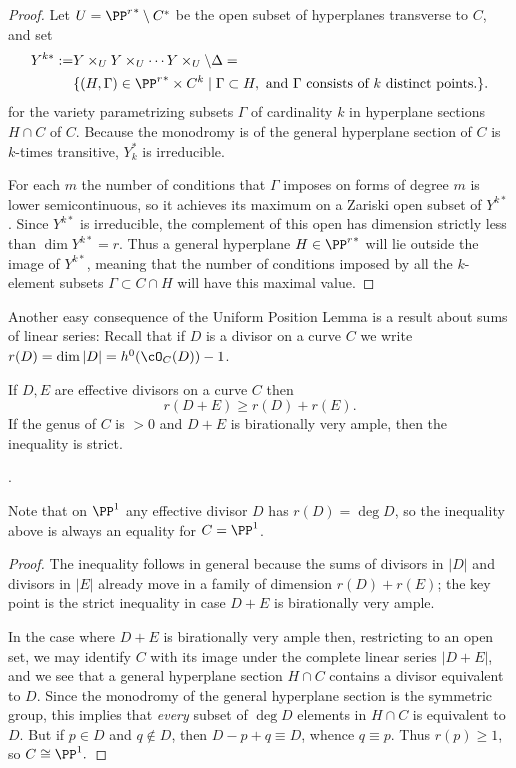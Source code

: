 \begin{proof} Let $U = {\PP^r}^* \setminus C^*$ be the open subset of hyperplanes transverse to $C$, and set
\begin{align*}
 Y^{k*} :=&Y\times_U Y\times_U \cdots Y\times_U \setminus \Delta  =\\
                                                 & \{ (H, \Gamma) \in {\PP^r}^* \times C^k \mid \Gamma \subset H, \hbox{ and $\Gamma$ consists of $k$ distinct points.}\}.
\end{align*}
for the variety parametrizing subsets $\Gamma$ of cardinality $k$ in hyperplane sections $H \cap C$ of $C$. Because the monodromy is of the general hyperplane section of $C$ is
$k$-times transitive, $Y_k^*$ is irreducible.

For each $m$ the number of conditions that $\Gamma$ imposes on forms of degree $m$ is lower semicontinuous, so it achieves its maximum on a Zariski open subset of $Y^{k*}$. Since $Y^{k*}$ is irreducible, the complement of this open has dimension strictly less than $\dim Y^{k*} = r$. Thus a general hyperplane $H \in {\PP^r}^*$ will lie outside the image of $Y^{k*}$, meaning that the number of conditions imposed by all the $k$-element subsets $\Gamma \subset C \cap H$ will have this maximal value.
\end{proof}

Another easy consequence of the Uniform Position Lemma is a result about sums of linear series:
Recall that if $D$ is a divisor on a curve $C$ we write $r(D) = \dim |D| = h^0(\cO_C(D))-1$.

\begin{corollary}\label{Clifford equality plus}
If $D,E$ are effective divisors on a curve $C$ then
$$
r(D+E) \geq r(D)+r(E).
$$
If the genus of $C$ is $>0$ and $D+E$ is birationally very ample, then the inequality is strict.
\end{corollary}.

Note that on $\PP^1$ any effective divisor $D$ has $r(D) = \deg D$, so the inequality above is
always an equality for $C = \PP^1$.

\begin{proof}
 The inequality follows in general because the sums of divisors in $|D|$ and divisors in $|E|$ already move in 
 a family of dimension $r(D)+r(E)$; the key point is the strict inequality in case $D+E$ is birationally very ample.
 
In the case where $D+E$ is birationally very ample then, restricting to an open set,
we may identify $C$ with its image under the complete linear series $|D+E|$, and we see that a general hyperplane section $H\cap C$ contains a divisor equivalent to $D$. Since the monodromy of the general hyperplane section
is the symmetric group, this implies that \emph{every} subset of $\deg D$ elements in $H\cap C$ is
equivalent to $D$. But if $p\in D$ and $q\notin D$, then $D-p+q \equiv D$, whence $q\equiv p$. Thus
$r(p)\geq 1$, so $C\cong \PP^1.$
\end{proof}

